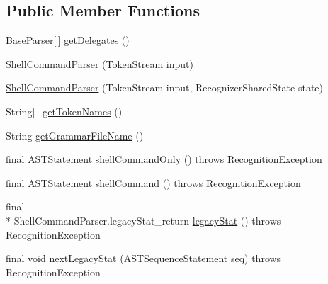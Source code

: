 \subsection*{Public Member Functions}
\begin{DoxyCompactItemize}
\item 
\hyperlink{classorg_1_1tzi_1_1use_1_1parser_1_1base_1_1_base_parser}{Base\-Parser}\mbox{[}$\,$\mbox{]} \hyperlink{classorg_1_1tzi_1_1use_1_1parser_1_1shell_1_1_shell_command_parser_ac164df9836fd4322091152bc4422e455}{get\-Delegates} ()
\item 
\hyperlink{classorg_1_1tzi_1_1use_1_1parser_1_1shell_1_1_shell_command_parser_ad72be091872d5402c9709d2d1355da9c}{Shell\-Command\-Parser} (Token\-Stream input)
\item 
\hyperlink{classorg_1_1tzi_1_1use_1_1parser_1_1shell_1_1_shell_command_parser_ae82e6bc2b0775f9130f466663943f660}{Shell\-Command\-Parser} (Token\-Stream input, Recognizer\-Shared\-State state)
\item 
String\mbox{[}$\,$\mbox{]} \hyperlink{classorg_1_1tzi_1_1use_1_1parser_1_1shell_1_1_shell_command_parser_aa0c618b932c5523e256c5afcc6b70fec}{get\-Token\-Names} ()
\item 
String \hyperlink{classorg_1_1tzi_1_1use_1_1parser_1_1shell_1_1_shell_command_parser_a06583df0f105985f288850001ee4bb90}{get\-Grammar\-File\-Name} ()
\item 
final \hyperlink{classorg_1_1tzi_1_1use_1_1parser_1_1soil_1_1ast_1_1_a_s_t_statement}{A\-S\-T\-Statement} \hyperlink{classorg_1_1tzi_1_1use_1_1parser_1_1shell_1_1_shell_command_parser_ae0c87df72d2ec05b2e14dc3634406fd8}{shell\-Command\-Only} ()  throws Recognition\-Exception 
\item 
final \hyperlink{classorg_1_1tzi_1_1use_1_1parser_1_1soil_1_1ast_1_1_a_s_t_statement}{A\-S\-T\-Statement} \hyperlink{classorg_1_1tzi_1_1use_1_1parser_1_1shell_1_1_shell_command_parser_a2d6a58d90a24fe9faf12e3558ecf2fb7}{shell\-Command} ()  throws Recognition\-Exception 
\item 
final \\*
Shell\-Command\-Parser.\-legacy\-Stat\-\_\-return \hyperlink{classorg_1_1tzi_1_1use_1_1parser_1_1shell_1_1_shell_command_parser_ab4fd70bc3557d4a08e51bf62be35de78}{legacy\-Stat} ()  throws Recognition\-Exception 
\item 
final void \hyperlink{classorg_1_1tzi_1_1use_1_1parser_1_1shell_1_1_shell_command_parser_a70a01d7cb9b8680ac79e6f7346482022}{next\-Legacy\-Stat} (\hyperlink{classorg_1_1tzi_1_1use_1_1parser_1_1soil_1_1ast_1_1_a_s_t_sequence_statement}{A\-S\-T\-Sequence\-Statement} seq)  throws Recognition\-Exception 

\end{DoxyCompactItemize}
